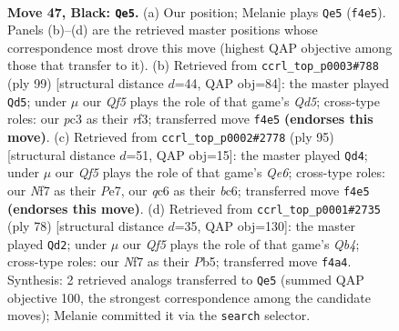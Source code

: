 \documentclass[11pt]{article}
\begin{document}
\clearpage

\begin{figure}[p]\centering
\begin{subfigure}{0.46\textwidth}\centering
\resizebox{\linewidth}{!}{%
\newchessgame
\chessboard[
  setfen={1k6/p1p2npp/1pQ5/2p3P1/5q2/2P5/1P6/1K6 b - - 10 47},
  showmover=false,
  pgfstyle=straightmove, color=movearrow, markmove={f4-e5}
]}
\caption{}
\end{subfigure}\hfill
\begin{subfigure}{0.46\textwidth}\centering
\resizebox{\linewidth}{!}{%
\newchessgame
\chessboard[
  setfen={5k2/6pQ/pp2pp1p/2n4P/P2q1P2/5R2/6PK/8 b - - 3 50},
  showmover=false,
  pgfstyle=straightmove, color=movearrow, markmove={d4-d5}
]}
\caption{}
\end{subfigure}
\\[4pt]
\begin{subfigure}{0.46\textwidth}\centering
\resizebox{\linewidth}{!}{%
\newchessgame
\chessboard[
  setfen={8/4ppk1/2Bp2p1/2p4p/2P4P/4q1P1/7K/5Q2 b - - 5 48},
  showmover=false,
  pgfstyle=straightmove, color=movearrow, markmove={e3-d4}
]}
\caption{}
\end{subfigure}\hfill
\begin{subfigure}{0.46\textwidth}\centering
\resizebox{\linewidth}{!}{%
\newchessgame
\chessboard[
  setfen={6k1/p4p2/4p2p/1P4p1/1Q4P1/4Pq1P/5P1K/8 w - - 5 40},
  showmover=false,
  pgfstyle=straightmove, color=movearrow, markmove={b4-d2}
]}
\caption{}
\end{subfigure}
\caption{\textbf{Move 47, Black: \texttt{Qe5}.} (a) Our position; Melanie plays \texttt{Qe5} (\texttt{f4e5}). Panels (b)--(d) are the retrieved master positions whose correspondence most drove this move (highest QAP objective among those that transfer to it). (b) Retrieved from \texttt{ccrl\_top\_p0003\#788} (ply 99) [structural distance $d$=44, QAP obj=84]: the master played \texttt{Qd5}; under $\mu$ our \emph{Qf5} plays the role of that game's \emph{Qd5}; cross-type roles: our \emph{p}c3 as their \emph{r}f3; transferred move \texttt{f4e5} \textbf{(endorses this move)}. (c) Retrieved from \texttt{ccrl\_top\_p0002\#2778} (ply 95) [structural distance $d$=51, QAP obj=15]: the master played \texttt{Qd4}; under $\mu$ our \emph{Qf5} plays the role of that game's \emph{Qe6}; cross-type roles: our \emph{N}f7 as their \emph{P}e7, our \emph{q}c6 as their \emph{b}c6; transferred move \texttt{f4e5} \textbf{(endorses this move)}. (d) Retrieved from \texttt{ccrl\_top\_p0001\#2735} (ply 78) [structural distance $d$=35, QAP obj=130]: the master played \texttt{Qd2}; under $\mu$ our \emph{Qf5} plays the role of that game's \emph{Qb4}; cross-type roles: our \emph{N}f7 as their \emph{P}b5; transferred move \texttt{f4a4}. Synthesis: 2 retrieved analogs transferred to \texttt{Qe5} (summed QAP objective 100, the strongest correspondence among the candidate moves); Melanie committed it via the \texttt{search} selector.}
\label{fig:thought-m93}
\end{figure}
\end{document}
